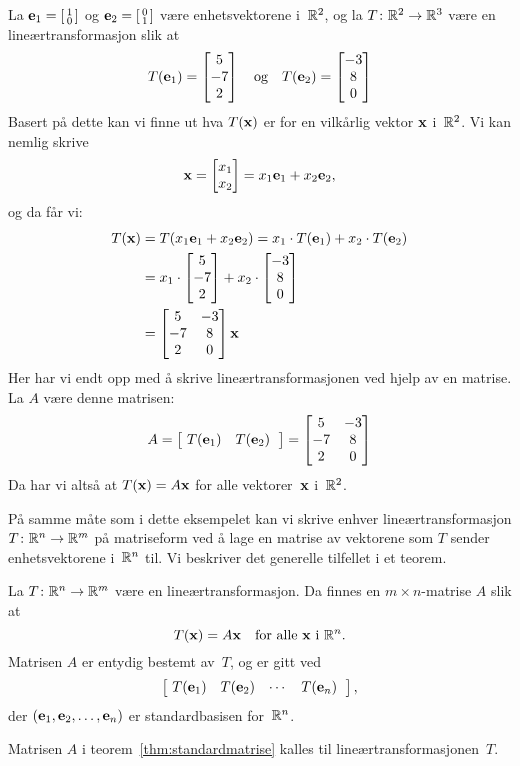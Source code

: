 \begin{ex}
La $\mathbf{e}_1 = \left[ \begin{smallmatrix} 1 \\ 0 \end{smallmatrix} \right]$ og $\mathbf{e}_2 = \left[ \begin{smallmatrix} 0 \\ 1 \end{smallmatrix} \right]$ være enhetsvektorene
i~$\mathbb{R}^2$, og la $T \colon \mathbb{R}^2 \to \mathbb{R}^3$ være en lineærtransformasjon
slik at
\[
T(\mathbf{e}_1) = \begin{bmatrix} 5 \\ -7 \\ 2 \end{bmatrix}
\quad\text{og}\quad
T(\mathbf{e}_2) = \begin{bmatrix} -3 \\ 8 \\ 0 \end{bmatrix}
\]
Basert på dette kan vi finne ut hva $T(\mathbf{x})$ er for en vilkårlig vektor
$\mathbf{x}$ i~$\mathbb{R}^2$.  Vi kan nemlig skrive
\[
\mathbf{x} = \begin{bmatrix} x_1 \\ x_2 \end{bmatrix} = x_1 \mathbf{e}_1 + x_2 \mathbf{e}_2,
\]
og da får vi:
\begin{align*}
T(\mathbf{x})
&= T(x_1 \mathbf{e}_1 + x_2 \mathbf{e}_2)
 = x_1 \cdot T(\mathbf{e}_1) + x_2 \cdot T(\mathbf{e}_2) \\
&= x_1 \cdot \begin{bmatrix} 5 \\ -7 \\ 2 \end{bmatrix} + x_2 \cdot \begin{bmatrix} -3 \\ 8 \\ 0 \end{bmatrix} \\
&=
\begin{bmatrix}
 5 & -3 \\
-7 &  8 \\
 2 &  0
\end{bmatrix}
\mathbf{x}
\end{align*}
Her har vi endt opp med å skrive lineærtransformasjonen ved hjelp av
en matrise.  La $A$ være denne matrisen:
\[
A = \begin{bmatrix} \ T(\e_1) & T(\e_2)\;\ \end{bmatrix}
  =
\begin{bmatrix}
 5 & -3 \\
-7 &  8 \\
 2 &  0
\end{bmatrix}
\]
Da har vi altså at $T(\mathbf{x}) = A\mathbf{x}$ for alle vektorer~$\mathbf{x}$ i~$\mathbb{R}^2$.
\end{ex}

På samme måte som i dette eksempelet kan vi skrive enhver
lineærtransformasjon $T \colon \mathbb{R}^n \to \mathbb{R}^m$ på matriseform ved å
lage en matrise av vektorene som $T$ sender enhetsvektorene i~$\mathbb{R}^n$
til.  Vi beskriver det generelle tilfellet i et teorem.

\begin{thm}
\label{thm:standardmatrise}
La $T \colon \mathbb{R}^n \to \mathbb{R}^m$ være en lineærtransformasjon.
Da finnes en $m \times n$-matrise $A$ slik at
\[
T(\mathbf{x}) = A\mathbf{x}
\quad\text{for alle $\mathbf{x}$ i $\mathbb{R}^n$.}
\]
Matrisen $A$ er entydig bestemt av~$T$, og er gitt ved
\[
\begin{bmatrix} \ T(\mathbf{e}_1) & T(\mathbf{e}_2) & \cdots & T(\mathbf{e}_n) \;\ \end{bmatrix},
\]
der $(\mathbf{e}_1, \mathbf{e}_2, \ldots, \mathbf{e}_n)$ er standardbasisen for~$\mathbb{R}^n$.
\end{thm}

\begin{defn}
Matrisen $A$ i teorem~\ref{thm:standardmatrise} kalles
 til lineærtransformasjonen~$T$.
\end{defn}

